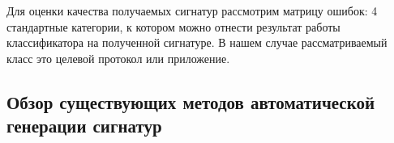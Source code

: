 Для оценки качества получаемых сигнатур рассмотрим матрицу ошибок: 4 стандартные категории, к котором можно отнести результат работы классификатора на полученной сигнатуре.
В нашем случае рассматриваемый класс это целевой протокол или приложение.

\begin{table}[H]
\centering
{}
\end{table}

\subsection{Обзор существующих методов автоматической генерации сигнатур}

\newpage
